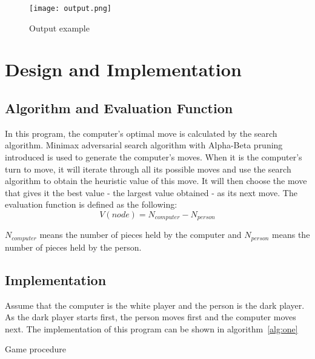 \documentclass[a4paper, 11pt]{article}
\begin{document}
\begin{figure}[!htbp]
  \centering
  \texttt{[image: output.png]}
  \caption{Output example}
  \label{fig:one}
\end{figure}

\section*{Design and Implementation}
\subsection{Algorithm and Evaluation Function}
In this program, the computer's optimal move is calculated by the search algorithm. Minimax adversarial search algorithm with Alpha-Beta pruning introduced is used to generate the computer's moves. When it is the computer's turn to move, it will iterate through all its possible moves and use the search algorithm to obtain the heuristic value of this move. It will then choose the move that gives it the best value - the largest value obtained - as its next move. The evaluation function is defined as the following:
\begin{equation}
\label{eqn:09}
V(node) = N_{computer} - N_{person}
\end{equation}

$N_{computer}$ means the number of pieces held by the computer and $N_{person}$ means the number of pieces held by the person.

\subsection{Implementation}
Assume that the computer is the white player and the person is the dark player. As the dark player starts first, the person moves first and the computer moves next. The implementation of this program can be shown in algorithm~\ref{alg:one}
\begin{algorithm}[!htbp]
\SetAlgoNoLine
{}
\caption{Game procedure}
\label{alg:one}
\end{algorithm}
\end{document}
